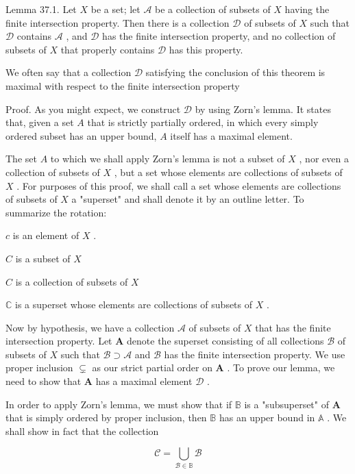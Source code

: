 Lemma 37.1. Let \(X\) be a set; let \(\mathcal{A}\) be a collection of subsets of \(X\) having the finite intersection property. Then there is a collection \(\mathcal{D}\) of subsets of \(X\) such that \(\mathcal{D}\) contains \(\mathcal{A}\) , and \(\mathcal{D}\) has the finite intersection property, and no collection of subsets of \(X\) that properly contains \(\mathcal{D}\) has this property.

We often say that a collection \(\mathcal{D}\) satisfying the conclusion of this theorem is maximal with respect to the finite intersection property

Proof. As you might expect, we construct \(\mathcal{D}\) by using Zorn’s lemma. It states that, given a set \(A\) that is strictly partially ordered, in which every simply ordered subset has an upper bound, \(A\) itself has a maximal element.

The set \(A\) to which we shall apply Zorn’s lemma is not a subset of \(X\) , nor even a collection of subsets of \(X\) , but a set whose elements are collections of subsets of \(X\) . For purposes of this proof, we shall call a set whose elements are collections of subsets of \(X\) a "superset" and shall denote it by an outline letter. To summarize the rotation:

\(c\) is an element of \(X\) .

\(C\) is a subset of \(X\)

\(C\) is a collection of subsets of \(X\)

\(\mathbb{C}\) is a superset whose elements are collections of subsets of \(X\) .

Now by hypothesis, we have a collection \(\mathcal{A}\) of subsets of \(X\) that has the finite intersection property. Let \(\mathbf{A}\) denote the superset consisting of all collections \(\mathcal{B}\) of subsets of \(X\) such that \(\mathcal{B} \supset  \mathcal{A}\) and \(\mathcal{B}\) has the finite intersection property. We use proper inclusion \(\subsetneq\) as our strict partial order on \(\mathbf{A}\) . To prove our lemma, we need to show that \(\mathbf{A}\) has a maximal element \(\mathcal{D}\) .

In order to apply Zorn’s lemma, we must show that if \(\mathbb{B}\) is a "subsuperset" of \(\mathbf{A}\) that is simply ordered by proper inclusion, then \(\mathbb{B}\) has an upper bound in \(\mathbb{A}\) . We shall show in fact that the collection

\[
\mathcal{C} = \mathop{\bigcup }\limits_{{\mathcal{B} \in  \mathbb{B}}}\mathcal{B}
\]

